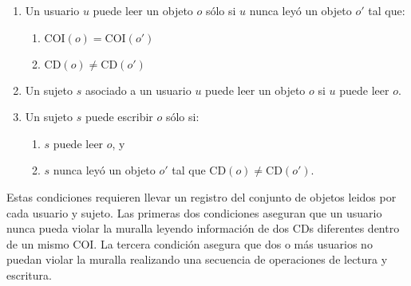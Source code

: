 \documentclass[spanish]{article}
\newcommand{\cd}{\text{CD}}
\newcommand{\coi}{\text{COI}}
\begin{document}
\begin{enumerate}
  \item Un usuario $u$ puede leer un objeto $o$ sólo si $u$ nunca leyó un objeto $o'$
tal que:
  \begin{enumerate}
    \item $\coi(o) = \coi(o')$
    \item $\cd(o) \neq \cd(o')$
  \end{enumerate}

\item Un sujeto $s$ asociado a un usuario $u$ puede leer un objeto $o$ si $u$
  puede leer $o$.
\item Un sujeto $s$ puede escribir $o$ sólo si:
  \begin{enumerate}
    \item $s$ puede leer $o$, y
    \item $s$ nunca leyó un objeto $o'$ tal que $\cd(o) \neq \cd(o')$.
  \end{enumerate}
\end{enumerate}

Estas condiciones requieren llevar un registro del conjunto de objetos leidos
por cada usuario y sujeto.
Las primeras dos condiciones aseguran que un usuario nunca pueda violar la
muralla leyendo información de dos CDs diferentes dentro de un mismo COI\@.
La tercera condición asegura que dos o más usuarios no puedan violar la muralla
realizando una secuencia de operaciones de lectura y escritura\@.


%
%
%
%
%
%
%



\end{document}
